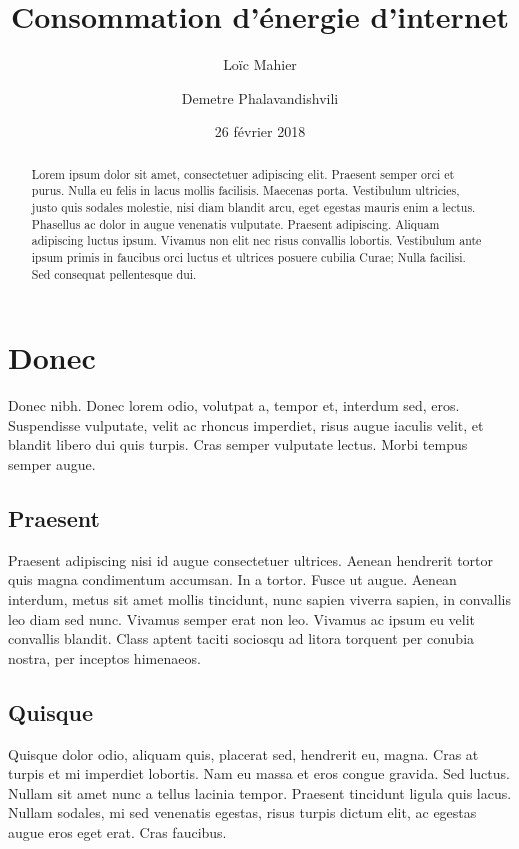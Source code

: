 \documentclass[a4paper,twocolumn,10pt]{article}
\title{Consommation d'énergie d'internet}
\author{Loïc Mahier \and Demetre Phalavandishvili}
\date{26 février 2018}
\begin{document}
\maketitle

\begin{abstract}
Lorem ipsum dolor sit amet, consectetuer adipiscing elit. Praesent semper orci
et purus. Nulla eu felis in lacus mollis facilisis. Maecenas porta. Vestibulum
ultricies, justo quis sodales molestie, nisi diam blandit arcu, eget egestas
mauris enim a lectus. Phasellus ac dolor in augue venenatis vulputate. Praesent
adipiscing. Aliquam adipiscing luctus ipsum. Vivamus non elit nec risus
convallis lobortis. Vestibulum ante ipsum primis in faucibus orci luctus et
ultrices posuere cubilia Curae; Nulla facilisi. Sed consequat pellentesque dui.
\end{abstract}


\section*{Donec}

Donec nibh. Donec lorem odio, volutpat a, tempor et, interdum sed, eros.
Suspendisse vulputate, velit ac rhoncus imperdiet, risus augue iaculis velit, et
blandit libero dui quis turpis. Cras semper vulputate lectus. Morbi tempus
semper augue.

\subsection*{Praesent}

Praesent adipiscing nisi id augue consectetuer ultrices. Aenean hendrerit tortor
quis magna condimentum accumsan. In a tortor. Fusce ut augue. Aenean interdum,
metus sit amet mollis tincidunt, nunc sapien viverra sapien, in convallis leo
diam sed nunc. Vivamus semper erat non leo. Vivamus ac ipsum eu velit convallis
blandit. Class aptent taciti sociosqu ad litora torquent per conubia nostra, per
inceptos himenaeos.

\subsection*{Quisque}

Quisque dolor odio, aliquam quis, placerat sed, hendrerit eu, magna. Cras at
turpis et mi imperdiet lobortis. Nam eu massa et eros congue gravida. Sed
luctus. Nullam sit amet nunc a tellus lacinia tempor. Praesent tincidunt ligula
quis lacus. Nullam sodales, mi sed venenatis egestas, risus turpis dictum elit,
ac egestas augue eros eget erat. Cras faucibus.
\end{document}
